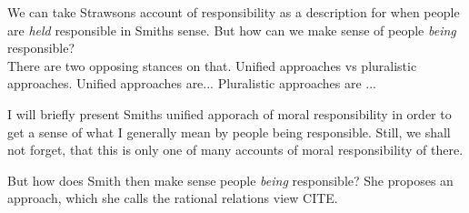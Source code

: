 \documentclass{article}
\begin{document}
%
%


We can take Strawsons account of responsibility as a description for when
people are \textit{held} responsible in Smiths sense. But how can we make sense
of people \textit{being} responsible?\\

There are two opposing stances on that. Unified approaches vs pluralistic
approaches. Unified approaches are...
Pluralistic approaches are ...

I will briefly present Smiths unified apporach of moral responsibility in order
to get a sense of what I generally mean by people being responsible. Still, we
shall not forget, that this is only one of many accounts of moral responsibility
of there.

But how does Smith then
make sense people \textit{being} responsible? She proposes an approach, which
she calls the rational relations view CITE.
\end{document}
